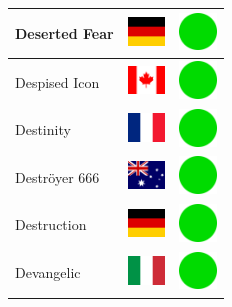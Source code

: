 \documentclass[12pt, a4paper, twoside]{report}
\begin{document}
\begin{center}
\begin{longtable}{|p{5cm}|p{2cm}|p{2cm}|}
 Deserted Fear                                              & \includegraphics[width=1cm]{../4x3/de} &   \includegraphics[width=1cm]{../likes/y} \\ \hline
 Despised Icon                                              & \includegraphics[width=1cm]{../4x3/ca} &   \includegraphics[width=1cm]{../likes/y} \\ \hline
 Destinity                                                  & \includegraphics[width=1cm]{../4x3/fr} &   \includegraphics[width=1cm]{../likes/y} \\ \hline
 Deströyer 666                                              & \includegraphics[width=1cm]{../4x3/au} &   \includegraphics[width=1cm]{../likes/y} \\ \hline
 Destruction                                                & \includegraphics[width=1cm]{../4x3/de} &   \includegraphics[width=1cm]{../likes/y} \\ \hline
 Devangelic                                                 & \includegraphics[width=1cm]{../4x3/it} &   \includegraphics[width=1cm]{../likes/y} \\ \hline

\end{longtable}
\end{center}
\end{document}
